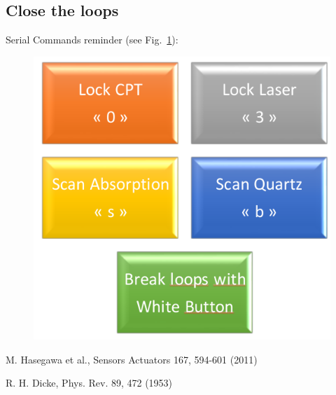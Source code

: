 \documentclass[a4paper,11pt]{article}
\begin{document}
\subsection{Close the loops}

Serial Commands reminder (see Fig.~\ref{fig:reminder}):
\begin{figure}[h!]
	\centering
	\includegraphics[width=0.5\linewidth]{reminder}
	\caption{}
	\label{fig:reminder}
\end{figure}





\begin{thebibliography}{9}
	
	M. Hasegawa et al., Sensors Actuators 167, 594-601 (2011)
	
	R. H. Dicke, Phys. Rev. 89, 472 (1953)
	
\end{thebibliography}
\end{document}
